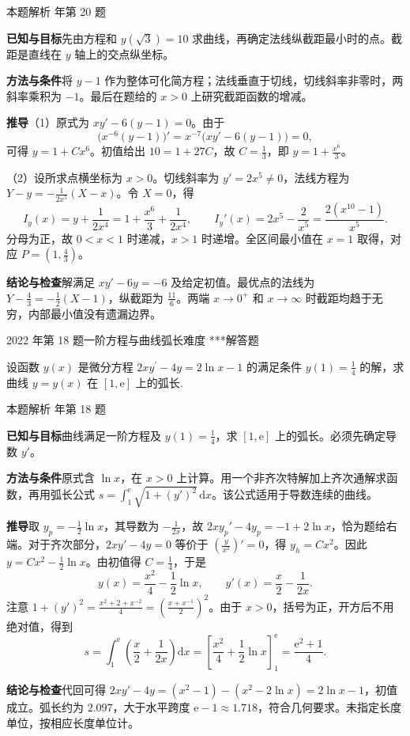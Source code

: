 \documentclass[UTF8,zihao=-4,fontset=fandol]{ctexart}
\newcounter{BankQuestion}
\newcommand{\QuestionPage}[7]{%
  \stepcounter{BankQuestion}%
  \par\noindent\begin{minipage}{\linewidth}
  \raggedright
  {\small\textcolor{black!60}{#3\quad #5\quad 难度 #7}\hfill\textcolor{accent}{#2}}\par\smallskip}
\newcommand{\QuestionEnd}{\end{minipage}\par\medskip}
\newcommand{\QuestionPage}[7]{%
  \clearpage
  \stepcounter{BankQuestion}%
  {\small\textcolor{accent}{#1\hfill #2}}\par\medskip
  {\small\textcolor{black!60}{#3\quad #5\quad 难度 #7\hfill \arabic{BankQuestion} / 234}}\par\vspace{9bp}}
\newcommand{\QuestionEnd}{}
\newenvironment{QuestionSolution}[1]{%
  \clearpage
  {\small\textcolor{black!60}{本题解析\quad #1}}\par\medskip
}{\par\clearpage}
\begin{document}
\begin{QuestionSolution}{2021 年第 20 题}
\textbf{已知与目标}\quad 先由方程和 \(y(\sqrt{3})=10\) 求曲线，再确定法线纵截距最小时的点。截距是直线在 \(y\) 轴上的交点纵坐标。

\textbf{方法与条件}\quad 将 \(y-1\) 作为整体可化简方程；法线垂直于切线，切线斜率非零时，两斜率乘积为 \(-1\)。最后在题给的 \(x>0\) 上研究截距函数的增减。

\textbf{推导}\quad （1）原式为 \(xy'-6(y-1)=0\)。由于
\[
\bigl(x^{-6}(y-1)\bigr)'=x^{-7}\bigl(xy'-6(y-1)\bigr)=0,
\]
可得 \(y=1+Cx^6\)。初值给出 \(10=1+27C\)，故 \(C=\frac{1}{3}\)，即 \(\boxed{y=1+\frac{x^6}{3}}\)。

（2）设所求点横坐标为 \(x>0\)。切线斜率为 \(y'=2x^5\ne0\)，法线方程为 \(Y-y=-\frac{1}{2x^5}(X-x)\)。令 \(X=0\)，得
\[
I_y(x)=y+\frac{1}{2x^4}=1+\frac{x^6}{3}+\frac{1}{2x^4},
\qquad I_y'(x)=2x^5-\frac{2}{x^5}=\frac{2(x^{10}-1)}{x^5}.
\]
分母为正，故 \(0<x<1\) 时递减，\(x>1\) 时递增。全区间最小值在 \(x=1\) 取得，对应 \(\boxed{P=(1,\frac{4}{3})}\)。

\textbf{结论与检查}\quad 解满足 \(xy'-6y=-6\) 及给定初值。最优点的法线为 \(Y-\frac{4}{3}=-\frac{1}{2}(X-1)\)，纵截距为 \(\frac{11}{6}\)。两端 \(x\to0^+\) 和 \(x\to\infty\) 时截距均趋于无穷，内部最小值没有遗漏边界。
\end{QuestionSolution}

\QuestionPage{4.1 几类简单的微分方程}{解答题}{2022 年第 18 题}{3}{一阶方程与曲线弧长}{216 / 234}{***}
设函数 \(y\left( x \right)\) 是微分方程
\(2x y^{\prime} - 4y = 2\ln x - 1\)
的满足条件
\(y\left( 1 \right) = \frac{1}{4}\)
的解，求曲线 \(y = y\left( x \right)\) 在 \(\left[ 1,\mathrm{e} \right]\) 上的弧长.
\QuestionEnd

\begin{QuestionSolution}{2022 年第 18 题}
\textbf{已知与目标}\quad 曲线满足一阶方程及 \(y(1)=\frac{1}{4}\)，求 \([1,\mathrm{e}]\) 上的弧长。必须先确定导数 \(y'\)。

\textbf{方法与条件}\quad 原式含 \(\ln x\)，在 \(x>0\) 上计算。用一个非齐次特解加上齐次通解求函数，再用弧长公式 \(s=\int_1^{\mathrm{e}}\sqrt{1+(y')^2}\,\mathrm{d}x\)。该公式适用于导数连续的曲线。

\textbf{推导}\quad 取 \(y_p=-\frac{1}{2}\ln x\)，其导数为 \(-\frac{1}{2x}\)，故 \(2xy_p'-4y_p=-1+2\ln x\)，恰为题给右端。对于齐次部分，\(2xy'-4y=0\) 等价于 \((\frac{y}{x^2})'=0\)，得 \(y_h=Cx^2\)。因此 \(y=Cx^2-\frac{1}{2}\ln x\)。由初值得 \(C=\frac{1}{4}\)，于是
\[
y(x)=\frac{x^2}{4}-\frac{1}{2}\ln x,\qquad
y'(x)=\frac{x}{2}-\frac{1}{2x}.
\]
注意 \(1+(y')^2=\frac{x^2+2+x^{-2}}{4}=(\frac{x+x^{-1}}{2})^2\)。由于 \(x>0\)，括号为正，开方后不用绝对值，得到
\[
s=\int_1^{\mathrm{e}}\left(\frac{x}{2}+\frac{1}{2x}\right)\mathrm{d}x
=\left[\frac{x^2}{4}+\frac{1}{2}\ln x\right]_1^{\mathrm{e}}
=\boxed{\frac{\mathrm{e}^2+1}{4}}.
\]

\textbf{结论与检查}\quad 代回可得 \(2xy'-4y=(x^2-1)-(x^2-2\ln x)=2\ln x-1\)，初值成立。弧长约为 \(2.097\)，大于水平跨度 \(\mathrm{e}-1\approx1.718\)，符合几何要求。未指定长度单位，按相应长度单位计。
\end{QuestionSolution}
\end{document}
